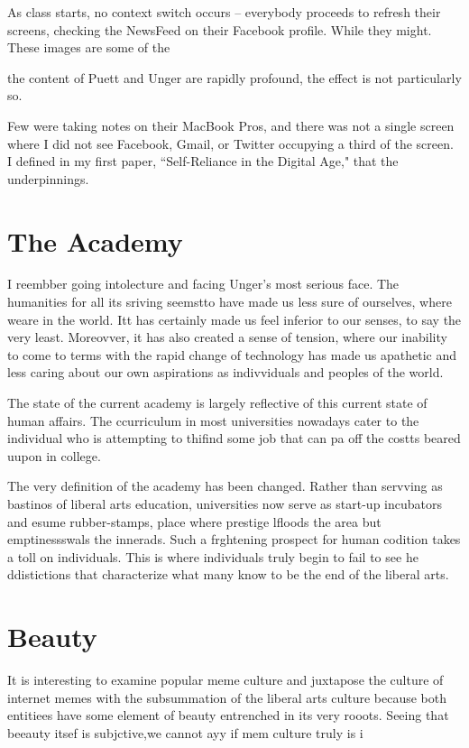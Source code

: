 \documentclass[12pt,letterpaper]{article}
\begin{document}
As class starts, no context switch occurs -- everybody proceeds to refresh their screens, checking the NewsFeed on their Facebook profile.  While they might.  These images are some of the 

the content of Puett and Unger are rapidly profound, the effect is not particularly so.  

Few were taking notes on their MacBook Pros, and there was not a single screen where I did not see Facebook, Gmail, or Twitter occupying a third of the screen.  I defined in my first paper, ``Self-Reliance in the Digital Age," that the underpinnings.


\section{The Academy}
I reembber going intolecture and  facing Unger's most serious face.  The humanities for all its sriving seemstto have made us less sure  of ourselves, where weare in the world.  Itt has certainly made us feel inferior to our senses, to say the very least.  Moreovver, it has also created a  sense of tension, where our inability to come to terms with the rapid change of technology has made  us apathetic and less caring about our own aspirations as indivviduals and peoples of the world.

The state of the current academy is largely reflective  of this current state of human affairs.  The ccurriculum in most universities nowadays  cater to the individual who is attempting to thifind some job that can pa off the costts  beared uupon in college.

The very definition of the academy  has been changed.  Rather than servving as bastinos of liberal arts education, universities now serve as start-up incubators and esume rubber-stamps,   place where prestige lfloods the area but emptinessswals the innerads.  Such a frghtening prospect for human codition takes a toll on individuals.  This is where individuals truly begin to fail to see he ddistictions that characterize what many know to be the end of the liberal arts.

\section{Beauty}
It is interesting to examine popular meme culture and juxtapose the culture of internet memes with the subsummation of the liberal arts culture because both entitiees have some element of beauty entrenched in its very rooots.  Seeing that beeauty itsef is subjctive,we  cannot ayy if mem culture truly is i%
\end{document}

